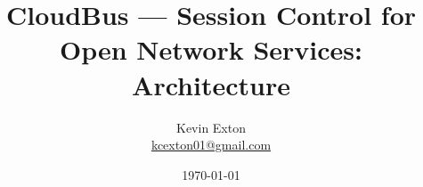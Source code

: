 \title{CloudBus --- Session Control for Open Network Services: Architecture}
\author[K. Exton]{
	\centering
	Kevin Exton\\
	\href{mailto:kcexton01@gmail.com}{\footnotesize kcexton01@gmail.com}
}
\date{\today}
\begin{frame}[plain]
	\titlepage
	\centering
	\footnotesize 
\end{frame}